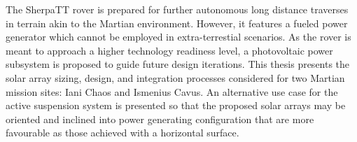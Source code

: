 \vspace{-3ex}

The SherpaTT rover is prepared for further autonomous long distance traverses in terrain akin to the Martian environment. However, it features a fueled power generator which cannot be employed in extra-terrestial scenarios. As the rover is meant to approach a higher technology readiness level, a photovoltaic power subsystem is proposed to guide future design iterations. This thesis presents the solar array sizing, design, and integration processes considered for two Martian mission sites: Iani Chaos and Ismenius Cavus. An alternative use case for the active suspension system is presented so that the proposed solar arrays may be oriented and inclined into power generating configuration that are more favourable as those achieved with a horizontal surface.
